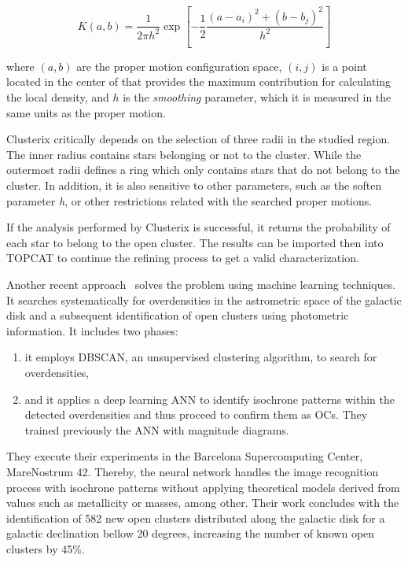 \documentclass[11pt,a4paper,english,twocolumn]{article}
\begin{document}
\begin{equation*}
  K(a, b) = \frac{1}{2 \pi h^{2}} \exp{ \left[ - \frac{1}{2}\frac{\left( a - a_{i} \right)^{2} + \left( b - b_{j} \right)^{2}}{ h^{2}} \right]}
\end{equation*}

where \(( a, b )\) are the proper motion configuration space, \(( i, j )\) is a point
located in the center of that provides the maximum contribution for calculating the
local density, and \(h\) is the \emph{smoothing} parameter, which it is measured in the
same units as the proper motion.

Clusterix critically depends on the selection of three radii in the studied region.
The inner radius contains stars belonging or not to the cluster. While the outermost
radii defines a ring which only contains stars that do not belong to the cluster.
In addition, it is also sensitive to other parameters, such as the soften parameter
\emph{h}, or other restrictions related with the searched proper motions.

If the analysis performed by Clusterix is successful, it returns the probability of
each star to belong to the open cluster. The results can be imported then into TOPCAT
to continue the refining process to get a valid characterization.

Another recent approach~\cite{castro2020hunting} solves the problem using machine
learning techniques. It searches systematically for overdensities in the astrometric
space of the galactic disk and a subsequent identification of open clusters using
photometric information. It includes two phases:

\begin{enumerate}
  \item it employs DBSCAN, an unsupervised clustering algorithm, to search for
        overdensities,
  \item and it applies a deep learning ANN to identify isochrone patterns within
        the detected overdensities and thus proceed to confirm them as OCs. They
        trained previously the ANN with magnitude diagrams.
\end{enumerate}

They execute their experiments in the Barcelona Supercomputing Center, MareNostrum 42.
Thereby, the neural network handles the image recognition process with isochrone
patterns without applying theoretical models derived from values such as metallicity
or masses, among other. Their work concludes with the identification of 582 new open
clusters distributed along the galactic disk for a galactic declination bellow 20
degrees, increasing the number of known open clusters by 45\%.
\end{document}
